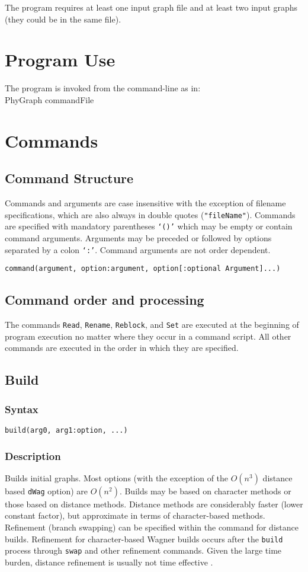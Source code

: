 \documentclass[11pt]{article}
\begin{document}
	

	
	The program requires at least one input graph file and at least two input graphs (they could be in the same file).

	
	\section{Program Use}
	The program is invoked from the command-line as in:\\
	PhyGraph commandFile\\
	
	\section{Commands}
		\subsection{Command Structure}
		Commands and arguments are case insensitive with the exception of filename specifications, which are also 
		always in double quotes (\texttt{"fileName"}).  Commands are specified with mandatory parentheses \texttt{`()'} which may be empty or
		contain command arguments. Arguments may be preceded or followed by options separated by a colon \texttt{`:'}.  Command arguments are not 
		order dependent.
		
		\bigskip
		\texttt{command(argument, option:argument, option[:optional Argument]...)}
		\subsection{Command order and processing}
			The commands \texttt{Read}, \texttt{Rename}, \texttt{Reblock}, and \texttt{Set} are executed at the beginning of program execution no matter where they occur in a command
			script.  All other commands are executed in the order in which they are specified.
	
	\subsection{Build}
		\subsubsection{Syntax}
		\texttt{build(arg0, arg1:option, ...)}
		\subsubsection{Description}
		Builds initial graphs.  Most options (with the exception of the $O(n^3)$ distance based \texttt{dWag} option)
		are $O(n^2)$.  Builds may be based on character methods or those based on distance methods.  Distance methods are considerably faster 
		(lower constant factor), but approximate in terms of character-based methods.  Refinement (branch swapping) can be specified
		within the command for distance builds.  Refinement for character-based Wagner builds occurs after the \texttt{build} process through \texttt{swap} and
		 other refinement commands.  Given the large time burden, distance refinement is usually not time effective \citep{Wheeler2021}.
\end{document}
